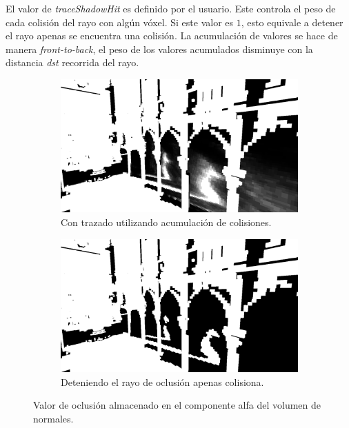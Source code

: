 El valor de \emph{traceShadowHit} es definido por el usuario. Este controla el peso de cada colisión del rayo con algún vóxel. Si este valor es $1$, esto equivale a detener el rayo apenas se encuentra una colisión. La acumulación de valores se hace de manera \emph{front-to-back}, el peso de los valores acumulados disminuye con la distancia \emph{dst} recorrida del rayo.

\begin{figure}[H]
	\centering
	\begin{subfigure}[t]{0.49\textwidth}
		\centering
		\captionsetup{justification=centering}
		\includegraphics[width=\linewidth]{media/soft_traced.png}
		\caption*{Con trazado utilizando acumulación de colisiones.}
	\end{subfigure}%
	\hspace{0.01\textwidth}
	\begin{subfigure}[t]{0.49\textwidth}
		\centering
		\captionsetup{justification=centering}
		\includegraphics[width=\linewidth]{media/hard_traced.png}
		\caption*{Deteniendo el rayo de oclusión apenas colisiona.}
	\end{subfigure}%
	\caption{Valor de oclusión almacenado en el componente alfa del volumen de normales.}
	\label{fig:vshadows_hit}
\end{figure}

